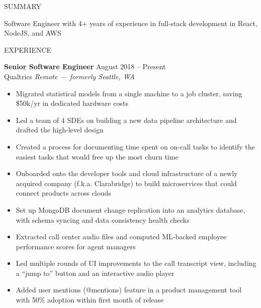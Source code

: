 \documentclass{resume} %
\begin{document}
\begin{rSection}{SUMMARY}

	{Software Engineer with 4+ years of experience in full-stack development in React, NodeJS, and AWS}

\end{rSection}


\begin{rSection}{EXPERIENCE}

	\textbf{Senior Software Engineer} \hfill August 2018 -- Present\\
	Qualtrics \hfill \textit{Remote --- formerly Seattle, WA}
	\begin{itemize}
		\itemsep -3pt {}
		\item Migrated statistical models from a single machine to a job cluster, saving \$50k/yr in dedicated hardware costs
		\item Led a team of 4 SDEs on building a new data pipeline architecture and drafted the high-level design
		\item Created a process for documenting time spent on on-call tasks to identify the easiest tasks that would free up the most churn time
		\item Onboarded onto the developer tools and cloud infrastructure of a newly acquired company (f.k.a. Clarabridge) to build microservices that could connect products across clouds
		\item Set up MongoDB document change replication into an analytics database, with schema syncing and data consistency health checks
		\item Extracted call center audio files and computed ML-backed employee performance scores for agent managers
		\item Led multiple rounds of UI improvements to the call transcript view, including a “jump to” button and an interactive audio player
		\item Added user mentions (@mentions) feature in a product management tool with 50\% adoption within first month of release
	\end{itemize}
\iffalse
	\textbf{Software Engineering Intern} \hfill June 2017 -- August 2017\\
	Cisco \hfill \textit{Dallas, TX}
	\begin{itemize}
		\item Created a API and CLI for an internal form submission app using Java Spring
	\end{itemize}

	\textbf{Software Engineering Intern} \hfill May 2016 -- August 2016\\
	Cvent \hfill \textit{Austin, TX}
	\begin{itemize}
		\item Wrote unit tests for a legacy codebase, which caught a production bug involving date calculations
	\end{itemize}
\fi
\end{rSection}
\end{document}
